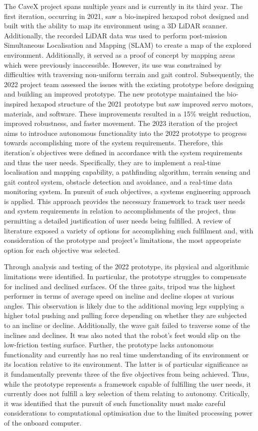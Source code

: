 The CaveX project spans multiple years and is currently in its third year. The first iteration, occurring in 2021, saw a bio-inspired hexapod robot designed and built with the ability to map its environment using a 3D LiDAR scanner. Additionally, the recorded LiDAR data was used to perform post-mission Simultaneous Localisation and Mapping (SLAM) to create a map of the explored environment. Additionally, it served as a proof of concept by mapping areas which were previously inaccessible. However, its use was constrained by difficulties with traversing non-uniform terrain and gait control. Subsequently, the 2022 project team assessed the issues with the existing prototype before designing and building an improved prototype. The new prototype maintained the bio-inspired hexapod structure of the 2021 prototype but saw improved servo motors, materials, and software. These improvements resulted in a 15\% weight reduction, improved robustness, and faster movement. The 2023 iteration of the project aims to introduce autonomous functionality into the 2022 prototype to progress towards accomplishing more of the system requirements. Therefore, this iteration's objectives were defined in accordance with the system requirements and thus the user needs. Specifically, they are to implement a real-time localisation and mapping capability, a pathfinding algorithm, terrain sensing and gait control system, obstacle detection and avoidance, and a real-time data monitoring system. In pursuit of such objectives, a systems engineering approach is applied. This approach provides the necessary framework to track user needs and system requirements in relation to accomplishments of the project, thus permitting a detailed justification of user needs being fulfilled. A review of literature exposed a variety of options for accomplishing such fulfilment and, with consideration of the prototype and project's limitations, the most appropriate option for each objective was selected.

Through analysis and testing of the 2022 prototype, its physical and algorithmic limitations were identified. In particular, the prototype struggles to compensate for inclined and declined surfaces. Of the three gaits, tripod was the highest performer in terms of average speed on incline and decline slopes at various angles. This observation is likely due to the additional moving legs supplying a higher total pushing and pulling force depending on whether they are subjected to an incline or decline. Additionally, the wave gait failed to traverse some of the inclines and declines. It was also noted that the robot's feet would slip on the low-friction testing surface. Further, the prototype lacks autonomous functionality and currently has no real time understanding of its environment or its location relative to its environment. The latter is of particular significance as it fundamentally prevents three of the five objectives from being achieved. Thus, while the prototype represents a framework capable of fulfilling the user needs, it currently does not fulfill a key selection of them relating to autonomy. Critically, it was identified that the pursuit of such functionality must make careful considerations to computational optimisation due to the limited processing power of the onboard computer. 

